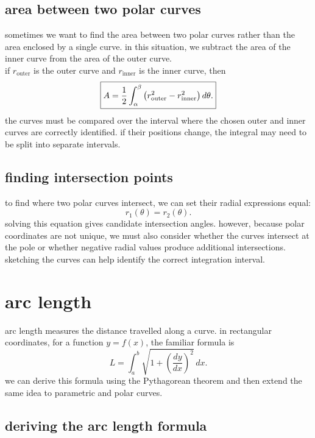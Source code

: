 \documentclass{article}
\newcommand{\mybox}[1]{\fbox{\ensuremath{\displaystyle #1}}}
\begin{document}
\subsection{area between two polar curves}

sometimes we want to find the area between two polar curves rather than the area enclosed by a single curve. in this situation, we subtract the area of the inner curve from the area of the outer curve.\\

if $r_{\mathrm{outer}}$ is the outer curve and $r_{\mathrm{inner}}$ is the inner curve, then
\[
\mybox{
A=
\frac12\int_\alpha^\beta
\left(
r_{\mathrm{outer}}^2-r_{\mathrm{inner}}^2
\right)d\theta.
}
\]
the curves must be compared over the interval where the chosen outer and inner curves are correctly identified. if their positions change, the integral may need to be split into separate intervals.\\

\subsection{finding intersection points}

to find where two polar curves intersect, we can set their radial expressions equal:
\[
r_1(\theta)=r_2(\theta).
\]
solving this equation gives candidate intersection angles. however, because polar coordinates are not unique, we must also consider whether the curves intersect at the pole or whether negative radial values produce additional intersections. sketching the curves can help identify the correct integration interval.\\

\newpage

\section{arc length}

arc length measures the distance travelled along a curve. in rectangular coordinates, for a function $y=f(x)$, the familiar formula is
\[
L=\int_a^b\sqrt{1+\left(\frac{dy}{dx}\right)^2}\,dx.
\]
we can derive this formula using the Pythagorean theorem and then extend the same idea to parametric and polar curves.\\

\subsection{deriving the arc length formula}
\end{document}
